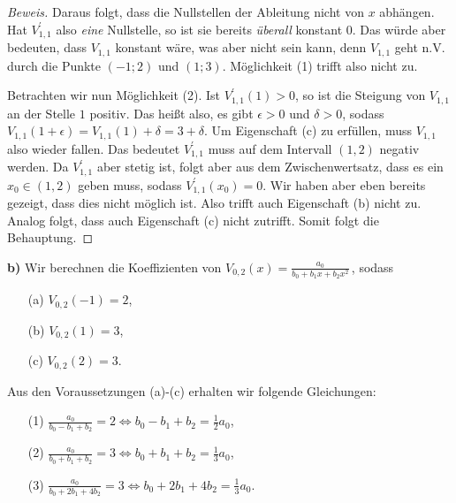 \documentclass[a4paper]{article}
\begin{document}
\begin{proof}[Beweis]
    Daraus folgt, dass die Nullstellen der Ableitung nicht von $x$ abhängen. Hat $V_{1,1}^\prime$ also \textit{eine} 
    Nullstelle, so ist sie bereits \textit{überall} konstant $0$. Das würde aber bedeuten, dass $V_{1,1}$ konstant wäre, was aber
    nicht sein kann, denn $V_{1,1}$ geht n.V. durch die Punkte $(-1; 2)$ und $(1; 3)$. Möglichkeit (1) trifft also nicht zu.\par
    Betrachten wir nun Möglichkeit (2). Ist $V_{1,1}^\prime(1) > 0$, so ist die Steigung von $V_{1,1}$ an der Stelle $1$ positiv.
    Das heißt also, es gibt $\epsilon>0$ und $\delta>0$, sodass $V_{1,1}(1+\epsilon) = V_{1,1}(1) + \delta = 3 + \delta$.
    Um Eigenschaft (c) zu erfüllen, muss $V_{1,1}$ also wieder fallen. Das bedeutet $V_{1,1}^\prime$ muss auf dem Intervall 
    $(1,2)$ negativ werden. Da $V_{1,1}^\prime$ aber stetig ist, folgt aber aus dem Zwischenwertsatz, dass es ein $x_0\in (1,2)$ geben muss, sodass 
    $V_{1,1}^\prime(x_0) = 0$. Wir haben aber eben bereits gezeigt, dass dies nicht möglich ist. Also trifft auch Eigenschaft (b) nicht zu.
    Analog folgt, dass auch Eigenschaft (c) nicht zutrifft. Somit folgt die Behauptung.
\end{proof}

\textbf{b)} Wir berechnen die Koeffizienten von $V_{0,2}(x) = \frac{a_0}{b_0+b_1x+b_2x^2}$\,, sodass 
    \begin{itemize}
        \item[(a)] $V_{0,2}(-1) = 2$, 
        \item[(b)] $V_{0,2}(1) = 3$,
        \item[(c)] $V_{0,2}(2) = 3$. 
    \end{itemize}

    Aus den Voraussetzungen (a)-(c) erhalten wir folgende Gleichungen:
    \begin{itemize}
        \item[(1)] $\frac{a_0}{b_0-b_1+b_2} = 2  \Longleftrightarrow  b_0 - b_1 + b_2 = \frac{1}{2}a_0$,
        \item[(2)] $\frac{a_0}{b_0+b_1+b_2} = 3  \Longleftrightarrow  b_0 + b_1 + b_2 = \frac{1}{3}a_0$,
        \item[(3)] $\frac{a_0}{b_0+2b_1+4b_2} = 3 \Longleftrightarrow b_0 + 2b_1 + 4b_2 = \frac{1}{3}a_0$.  
    \end{itemize}
\end{document}
